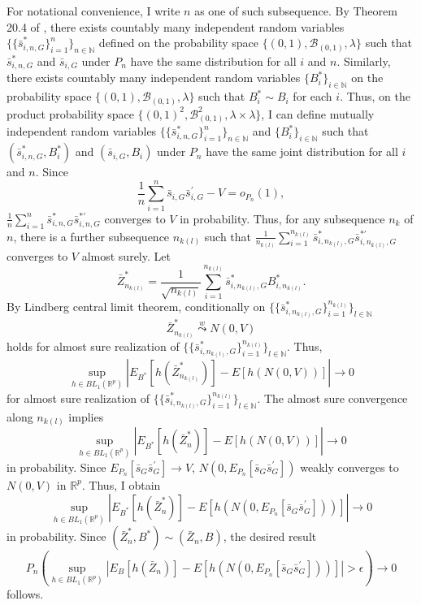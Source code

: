 \documentclass[12pt,oneside,reqno,english]{amsart}
\theoremstyle{definition}
\begin{document}
For notational convenience, I write $n$ as one of such subsequence. 
By Theorem 20.4 of \cite{Billingsley:95}, there exists countably many independent random variables $\{\{\bar{s}^{*}_{i,n,G}\}_{i=1}^{n}\}_{n\in \mathbb{N}}$ 
defined on the probability space $\{(0,1),\mathcal{B}_{(0,1)},\lambda\}$ such that $\bar{s}^{*}_{i,n,G}$ and $\bar{s}_{i,G}$ under $P_{n}$
have the same distribution for all $i$ and $n$. 
Similarly, there exists countably many independent random variables $\{B_{i}^{*}\}_{i\in \mathbb{N}}$ on the probability space 
$\{(0,1),\mathcal{B}_{(0,1)},\lambda\}$ such that $B_{i}^{*}\sim B_{i}$ for each $i$. Thus, on the product probability space $\{(0,1)^{2},\mathcal{B}^{2}_{(0,1)},\lambda\times \lambda\}$, I can define mutually independent random variables
 $\{\{\bar{s}^{*}_{i,n,G}\}_{i=1}^{n}\}_{n\in \mathbb{N}}$ and $\{B_{i}^{*}\}_{i\in \mathbb{N}}$ 
such that $(\bar{s}^{*}_{i,n,G},B^{*}_{i})$ and $(\bar{s}_{i,G},B_{i})$ under $P_{n}$ have the same joint distribution for all $i$ and $n$. 
Since 
\[\frac{1}{n}\sum_{i=1}^{n} \bar{s}_{i,G}\bar{s}^{\prime}_{i,G}-V=o_{P_{n}}(1),\]
$\frac{1}{n}\sum_{i=1}^{n} \bar{s}^{*}_{i,n,G}\bar{s}^{*\prime}_{i,n,G}$ converges to $V$ in probability. 
Thus, for any subsequence $n_{k}$ of $n$, there is a further subsequence $n_{k(l)}$ such that $\frac{1}{n_{k(l)}}\sum_{i=1}^{n_{k(l)}} \bar{s}^{*}_{i,n_{k(l)},G}\bar{s}^{*\prime}_{i,n_{k(l)},G}$ converges to $V$ almost surely. 
Let 
\[\bar{Z}^{*}_{n_{k(l)}}=\frac{1}{\sqrt{n_{k(l)}}}\sum_{i=1}^{n_{k(l)}}\bar{s}^{*}_{i,n_{k(l)},G}B^{*}_{i,n_{k(l)}}.\]
By Lindberg central limit theorem, conditionally on $\{\{\bar{s}^{*}_{i,n_{k(l)},G}\}_{i=1}^{n_{k(l)}}\}_{l\in \mathbb{N}}$
\[\bar{Z}^{*}_{n_{k(l)}}\overset{w}{\underset{}{\leadsto}}N(0,V)\]
holds for almost sure realization of $\{\{\bar{s}^{*}_{i,n_{k(l)},G}\}_{i=1}^{n_{k(l)}}\}_{l\in \mathbb{N}}$. 
Thus, 
\[\sup_{h\in BL_{1}(\mathbb{R}^{p})}|E_{B^{*}}[h(\bar{Z}^{*}_{n_{k(l)}})]-E[h(N(0,V))]|\rightarrow 0\]
for almost sure realization of $\{\{\bar{s}^{*}_{i,n_{k(l)},G}\}_{i=1}^{n_{k(l)}}\}_{l\in \mathbb{N}}$. 
The almost sure convergence 
along $n_{k(l)}$ implies 
\[\sup_{h\in BL_{1}(\mathbb{R}^{p})}|E_{B^{*}}[h(\bar{Z}^{*}_{n})]-E[h(N(0,V))]|\rightarrow 0\]
in probability.
Since $E_{P_{n}}[\bar{s}_{G}\bar{s}_{G}^{\prime}]\rightarrow V$, $N(0,E_{P_{n}}[\bar{s}_{G}\bar{s}_{G}^{\prime}])$ weakly converges to 
 $N(0,V)$ in $\mathbb{R}^{p}$. Thus, I obtain 
\[\sup_{h\in BL_{1}(\mathbb{R}^{p})}|E_{B^{*}}[h(\bar{Z}^{*}_{n})]-E[h(N(0,E_{P_{n}}[\bar{s}_{G}\bar{s}_{G}^{\prime}]))]|\rightarrow 0\]
in probability. Since 
$(\bar{Z}^{*}_{n},B^{*})\sim (\bar{Z}_{n},B)$, the desired result
\[P_{n}\left(\sup_{h\in BL_{1}(\mathbb{R}^{p})}|E_{B}[h(\bar{Z}_{n})]-E[h(N(0,E_{P_{n}}[\bar{s}_{G}\bar{s}_{G}^{\prime}]))]|>\epsilon \right)\rightarrow 0\]
follows.
\end{document}
